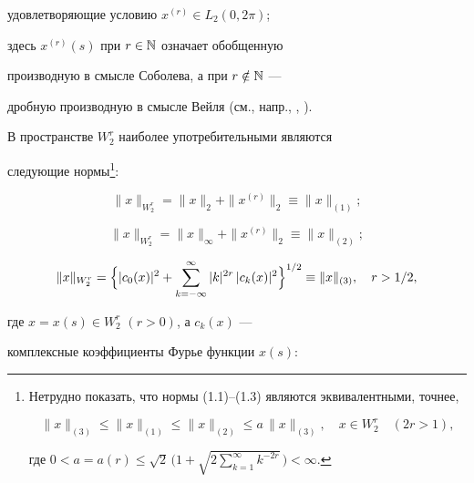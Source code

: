 удовлетворяющие условию $x^{(r)}\in L_2(0,2\pi )$;


здесь $x^{(r)}(s)$ при $r\in \Bbb{N}$ означает обобщенную


производную в смысле Соболева, а при $r\notin \Bbb{N}$ ---


дробную производную в смысле Вейля (см., напр., \cite{Nik}, \cite{Zy}).


В пространстве $W_2^r$ наиболее употребительными являются


следующие нормы\footnote{




Нетрудно показать, что нормы (1.1)--(1.3) являются эквивалентными, точнее,


$$


\|x\|_{(3)}\le \|x\|_{(1)} \le \|x\|_{(2)} \le


a\, \|x\|_{(3)},\quad x\in W_2^r\quad (2r>1),


$$


где $0<a=a(r)\le \sqrt{2}\, \biggl(1+\sqrt{2\sum_{k=1}^\infty k^{-2r}}


\, \biggr) <\infty $.}:







\begin{equation}


\|x\|_{W_2^r}=\|x\|_2 +\|x^{(r)}\|_2 \equiv \|x\|_{(1)};


\end{equation}


%


\begin{equation}


\|x\|_{W_2^r}=\|x\|_\infty +\|x^{(r)}\|_2 \equiv \|x\|_{(2)};


\end{equation}


%


\begin{equation}


\|x\|_{W_2^r}=\Bigl\{ |c_0(x)|^2 +


\sum_{k=-\infty }^\infty |k|^{2r}\, |c_k(x)|^2


\Bigr\}^{1/2}\equiv \|x\|_{(3)}, \quad r>1/2 ,


\end{equation}


где $x=x(s)\in W_2^r$ $(r>0)$, а $c_k(x)$ ---


комплексные коэффициенты Фурье функции $x(s)$:



